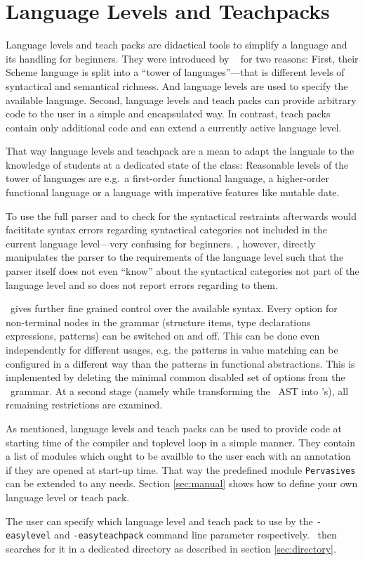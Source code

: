 
\section{Language Levels and Teachpacks}
\label{sec:teachpacks}

Language levels and teach packs are didactical tools to simplify a language and
its handling for beginners. They were introduced by \drscheme\
\citep{Felleisen98thedrscheme}  for two reasons: First, their Scheme language is
split into a ``tower of languages''---that is different levels of syntactical
and semantical richness. And language levels are used to specify the available
language. Second, language levels and teach packs can provide arbitrary code to
the user in a simple and encapsulated way. In contrast, teach packs contain only
additional code and can extend a currently active language level.

That way language levels and teachpack are a mean to adapt the languale to the
knowledge of students at a dedicated state of the class: Reasonable levels of
the tower of languages are e.g.\ a first-order functional language, a
higher-order functional language or a language with imperative features like
mutable date.

To use the full parser and to check for the syntactical restraints afterwards
would facititate syntax errors regarding syntactical categories not included in
the current language level---very confusing for beginners. 
\easyocaml, however, directly manipulates the parser to the requirements of the
language level such that the parser itself does not even ``know'' about the
syntactical categories not part of the language level and so does not report
errors regarding to them.

\easyocaml\ gives further fine grained control over the available syntax.
Every option for non-terminal nodes in the grammar (structure items, type
declarations  expressions, patterns) can be switched on and off. This can be
done even independently for different usages, e.g. the patterns in value
matching\ttfootnote{match \dots\ with \emph{pat} -> \dots} can be configured in
a different way than the patterns in functional
abstractions. This is implemented by
deleting the minimal common disabled set of options from the \camlpf\ grammar.
At a second stage (namely while transforming the \ocaml\ AST into
\easyocaml's), all remaining restrictions are examined.

As mentioned, language levels and teach packs can be used to provide code at
starting time of the compiler and toplevel loop in a simple manner. They contain
a list of modules which ought to be availble to the user each with an annotation
if they are opened at start-up time. That way the predefined module
\texttt{Pervasives} can be extended to any needs.
Section \ref{sec:manual} shows how to define your own language level or teach
pack.

The user can specify which language level and teach pack to use by the 
\texttt{-easylevel} and \texttt{-easyteachpack} command line parameter 
respectively. \easyocaml\ then searches for it in a dedicated directory as
described in section \ref{sec:directory}.

